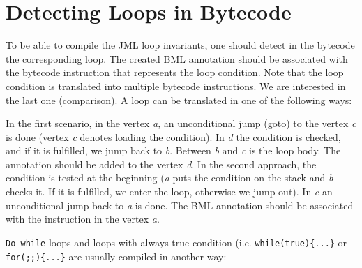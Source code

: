 \documentclass{acm_proc_article-sp}
\begin{document}
\section{Detecting Loops in Bytecode}
To be able to compile the JML loop invariants, one should detect in the bytecode the corresponding loop. The created BML annotation should be associated with the bytecode instruction that represents the loop condition. Note that the loop condition is translated into multiple bytecode instructions. We are interested in the last one (comparison). A loop can be translated in one of the following ways:
\begin{center}
\end{center}
In the first scenario, in the vertex \textit{a}, an unconditional jump (goto) to the vertex \textit{c} is done (vertex \textit{c} denotes loading the condition). In \textit{d} the condition is checked, and if it is fulfilled, we jump back to \textit{b}. Between \textit{b} and \textit{c} is the loop body. The annotation should be added to the vertex \textit{d}. In the second approach, the condition is tested at the beginning (\textit{a} puts the condition on the stack and \textit{b} checks it. If it is fulfilled, we enter the loop, otherwise we jump out). In \textit{c} an unconditional jump back to \textit{a} is done. The BML annotation should be associated with the instruction in the vertex \textit{a}.

\texttt{Do-while} loops and loops with always true condition (i.e. \texttt{while(true)\{...\}} or \texttt{for(;;)\{...\}} are usually compiled in another way:
\end{document}
